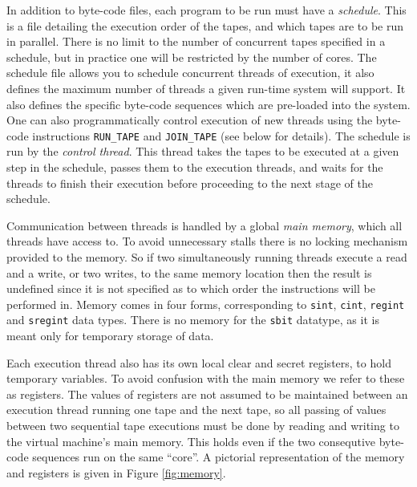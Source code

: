 In addition to byte-code files, each program to be run must
have a \emph{schedule}. This is a file detailing the execution
order of the tapes, and which tapes are to be run in parallel.
There is no limit to the number of concurrent tapes specified in a schedule,
but in practice one will be restricted by the number of cores.
The schedule file allows you to schedule concurrent threads
of execution, it also defines the maximum number of threads
a given run-time system will support. It also defines
the specific byte-code sequences which are pre-loaded
into the system.
One can also programmatically control execution of new
threads using the byte-code instructions \verb+RUN_TAPE+ and \verb+JOIN_TAPE+
(see below for details).
The schedule is run by the \emph{control thread}.
This thread takes the tapes to be executed at a
given step in the schedule, passes them to the execution
threads, and waits for the threads to
finish their execution before proceeding to the next stage of
the schedule.

Communication between threads is handled by a global
\emph{main memory}, which all threads have access to.
To avoid unnecessary stalls there is no locking mechanism provided to
the memory. So if two simultaneously running threads
execute a read and a write, or two writes, to the same
memory location then the result is undefined since it is
not specified as to which order the instructions
will be performed in.
Memory comes in four forms, corresponding to
\verb+sint+, \verb+cint+, \verb+regint+ and \verb+sregint+
data types. There is no memory for the \verb+sbit+
datatype, as it is meant only for temporary storage of data.

Each execution thread also has its own local clear and secret
registers, to hold temporary variables.
To avoid confusion with the main memory we refer to these
as registers.
The values of registers are not assumed to be maintained
between an execution thread running one tape and
the next tape, so all passing of values
between two sequential tape executions must be done
by reading and writing to the virtual machine's main memory.
This holds even if the two consequtive byte-code
sequences run  on the same ``core''.
A pictorial representation of the memory and registers is given in
Figure \ref{fig:memory}.


